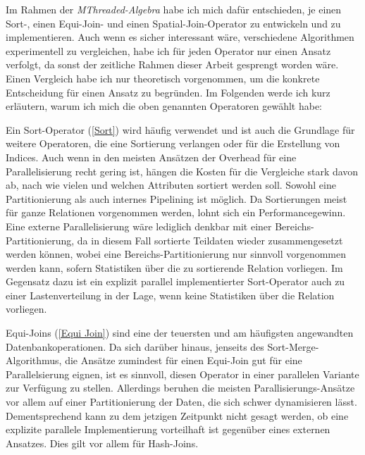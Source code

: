 \documentclass[a4paper,12pt,twoside]{article}
\newcommand{\Fb}[1]{\textit{#1}} %
\begin{document}
{Im Rahmen der \Fb{MThreaded-Algebra} habe ich mich dafür entschieden, je einen Sort-, einen Equi-Join- und einen Spatial-Join-Operator zu entwickeln und zu implementieren. Auch wenn es sicher interessant wäre, verschiedene Algorithmen experimentell zu vergleichen, habe ich für jeden Operator nur einen Ansatz verfolgt, da sonst der zeitliche Rahmen dieser Arbeit gesprengt worden wäre. Einen Vergleich habe ich nur theoretisch vorgenommen, um die konkrete Entscheidung für einen Ansatz zu begründen. Im Folgenden werde ich kurz erläutern, warum ich mich die oben genannten Operatoren gewählt habe:

Ein Sort-Operator (\autoref{Sort}) wird häufig verwendet und ist auch die Grundlage für weitere Operatoren, die eine Sortierung verlangen oder für die Erstellung von Indices. Auch wenn in den meisten Ansätzen der Overhead für eine Parallelisierung recht gering ist, hängen die Kosten für die Vergleiche stark davon ab, nach wie vielen und welchen Attributen sortiert werden soll. Sowohl eine Partitionierung als auch internes Pipelining ist möglich. Da Sortierungen meist für ganze Relationen vorgenommen werden, lohnt sich ein Performancegewinn. Eine externe Parallelisierung wäre lediglich denkbar mit einer Bereichs-Partitionierung, da in diesem Fall sortierte Teildaten wieder zusammengesetzt werden können, wobei eine Bereichs-Partitionierung nur sinnvoll vorgenommen werden kann, sofern Statistiken über die zu sortierende Relation vorliegen. Im Gegensatz dazu ist ein explizit parallel implementierter Sort-Operator auch zu einer Lastenverteilung in der Lage, wenn keine Statistiken über die Relation vorliegen.

Equi-Joins (\autoref{Equi Join}) sind eine der teuersten und am häufigsten angewandten Datenbankoperationen. Da sich darüber hinaus, jenseits des Sort-Merge-Algorithmus, die Ansätze zumindest für einen Equi-Join gut für eine Parallelsierung eignen, ist es sinnvoll, diesen Operator in einer parallelen Variante zur Verfügung zu stellen. Allerdings beruhen die meisten Parallisierungs-Ansätze vor allem auf einer Partitionierung der Daten, die sich schwer dynamisieren lässt. Dementsprechend kann zu dem jetzigen Zeitpunkt nicht gesagt werden, ob eine explizite parallele Implementierung vorteilhaft ist gegenüber eines externen Ansatzes. Dies gilt vor allem für Hash-Joins.

}
\end{document}
